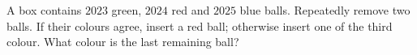 A box contains $2023$ green, $2024$ red and $2025$ blue balls. Repeatedly remove two balls. If their colours agree, insert a red ball; otherwise insert one of the third colour. What colour is the last remaining ball?
